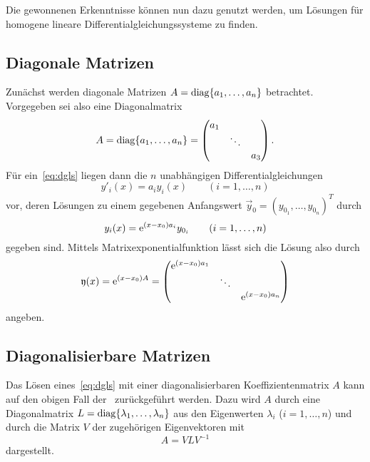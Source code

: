 Die gewonnenen Erkenntnisse können nun dazu genutzt werden, um Lösungen für homogene lineare Differentialgleichungssysteme zu finden.

\subsection{Diagonale Matrizen}\label{subsec:03-01}
Zunächst werden diagonale Matrizen $A = \operatorname{diag}\{a_1,\dots,a_n\}$ betrachtet.
Vorgegeben sei also eine Diagonalmatrix
\begin{equation*}
    A = \operatorname{diag}\{a_1,\dots,a_n\}
    = \begin{pmatrix}
          a_1 &        & \\
              & \ddots & \\
              &        & a_3
    \end{pmatrix}.
\end{equation*}
Für ein~\ref{eq:dgls} liegen dann die $n$ unabhängigen Differentialgleichungen
\begin{equation*}
    y'_i(x) = a_i y_i(x) \qquad (i = 1,\dots,n)
\end{equation*}
vor, deren Lösungen zu einem gegebenen Anfangswert $\vec{y}_0 = (y_{0_1},\dots,y_{0_n})^T$ durch
\begin{equation*}
    y_i(x) = \mathrm{e}^{(x - x_0) a_i} y_{0_i} \qquad (i = 1,\dots,n)
\end{equation*}
gegeben sind.
Mittels Matrixexponentialfunktion lässt sich die Lösung also durch
\begin{equation*}
    \mathfrak{y}(x) = \mathrm{e}^{(x - x_0) A}
    = \begin{pmatrix}
        \mathrm{e}^{(x - x_0) a_1} &        & \\
                   & \ddots & \\
                   &        & \mathrm{e}^{(x - x_0) a_n}
    \end{pmatrix}
\end{equation*}
angeben.

\subsection{Diagonalisierbare Matrizen}\label{subsec:03-02}
Das Lösen eines~\ref{eq:dgls} mit einer diagonalisierbaren Koeffizientenmatrix $A$ kann auf den obigen Fall der~
zurückgeführt werden.
Dazu wird $A$ durch eine Diagonalmatrix $L = \operatorname{diag}\{\lambda_1,\dots,\lambda_n\}$ aus den Eigenwerten $\lambda_i$ ($i = 1,\dots,n$)
und durch die Matrix $V$ der zugehörigen Eigenvektoren mit
\begin{equation*}
    A = V L V^{-1}
\end{equation*}
dargestellt.

